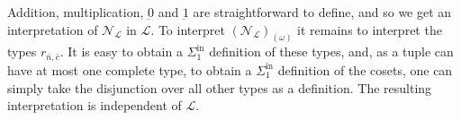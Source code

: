 \documentclass[11pt]{amsart}
\newcommand{\impmark}[1]{\strut\vadjust{\domark{\textcolor{#1}{$\blacktriangleright\blacktriangleright\blacktriangleright$}}}}
\newcommand{\domark}[1]{%
  \vbox to 0pt{
    \kern-\dp\strutbox
    \hbox{\smash{\llap{#1\kern1em}}}
    \vss
  }%
}
\newcommand{\comment}[1]{\impmark{blue}\ \textcolor{blue}{#1}}
\newcommand{\N}{\mathcal{N}}
\newcommand{\mc}[1]{\mathcal{#1}}
\newcommand{\Sinf}[1]{\Sigma^{\mathrm{in}}_{#1}}
\newcommand{\bigvvee}{%
	\mathop{
		\mathchoice{\bigvee\mkern-15mu\bigvee}
		{\bigvee\mkern-12.5mu\bigvee}
		{\bigvee\mkern-12.5mu\bigvee}
		{\bigvee\mkern-11mu\bigvee}
	}
}
\def\N{{\mathcal N}}
\theoremstyle{remark}
\newcommand{\ba}{\overline{a}}
\begin{document}
Addition, multiplication, $\underbar 0$ and $\underbar 1$ are straightforward to define, and so we get an interpretation of $\N_\mc{L}$ in $\mc{L}$. To interpret $(\mc{N}_\mc{L})_{(\omega)}$ it remains to interpret the types $r_{\bar n,\bar c}$. It is easy to obtain a $\Sinf{1}$ definition of these types, and, as a tuple can have at most one complete type, to obtain a $\Sinf{1}$ definition of the cosets, one can simply take the disjunction over all other types as a definition. 
The resulting interpretation is independent of $\mc{L}$.
\end{document}
